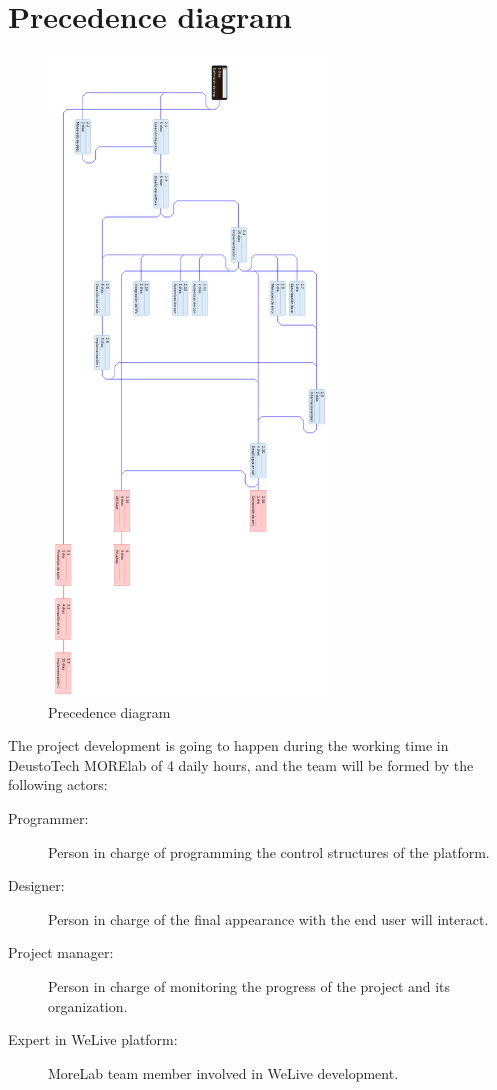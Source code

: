 \documentclass{DeustoFDP}
\begin{document}
\section{Precedence diagram}
\begin{figure}[H]
	\centering
	\includegraphics[width=210pt]{fig/precedencia}
	\caption{Precedence diagram}\label{fig:precedencediagram}
\end{figure}

The project development is going to happen during the working time in DeustoTech MORElab of 4 daily hours, and the team will be formed by the following actors:

\begin{description}
	\item[Programmer:] Person in charge of programming the control structures of the platform.
	\item[Designer:] Person in charge of the final appearance with the end user will interact.
	\item[Project manager:] Person in charge of monitoring the progress of the project and its organization.
	\item[Expert in WeLive platform:] MoreLab team member involved in WeLive development.
\end{description}
\end{document}
